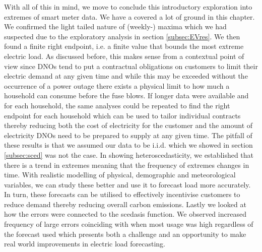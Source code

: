 With all of this in mind, we move to conclude this introductory exploration into extremes of smart meter data. We have a covered a lot of ground in this chapter. We confirmed the light tailed nature of (weekly-) maxima which we had suspected due to the exploratory analysis in section \ref{subsec:EVres}. We then found a finite right endpoint, i.e. a finite value that bounds the most extreme electric load. As discussed before, this makes sense from a contextual point of view since DNOs tend to put a contractual obligations on customers to limit their electric demand at any given time and while this may be exceeded without the occurrence of a power outage there exists a physical limit to how much a household can consume before the fuse blows. If longer data were available and for each household, the same analyses could be repeated to find the right endpoint for each household which can be used to tailor individual contracts thereby reducing both the cost of electricity for the customer and the amount of electricity DNOs need to be prepared to supply at any given time. The pitfall of these results is that we assumed our data to be i.i.d. which we showed in section \ref{subsec:sced} was not the case. In showing heteroscedasticity, we established that there is a trend in extremes meaning that the frequency of extremes changes in time. With realistic modelling of physical, demographic and meteorological variables, we can study these better and use it to forecast load more accurately. In turn, these forecasts can be utilised to effectively incentivise customers to reduce demand thereby reducing overall carbon emissions. Lastly we looked at how the errors were connected to the scedasis function. We observed increased frequency of large errors coinciding with when most usage was high regardless of the forecast used which presents both a challenge and an opportunity to make real  world improvements in electric load forecasting.



